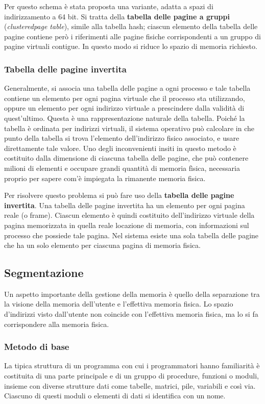 \documentclass[11pt,a4paper]{article}
\begin{document}
Per questo schema è stata proposta una variante, adatta a spazi di indirizzamento a 64
bit. Si tratta della \textbf{tabella delle pagine a gruppi} (\emph{clusteredpage table}), simile alla tabella hash;
ciascun elemento della tabella delle pagine contiene però i riferimenti alle pagine fisiche cor­rispondenti a un gruppo di pagine virtuali contigue. In questo modo si ri­duce lo spazio di memoria richiesto.

\subsubsection{Tabella delle pagine invertita}
Generalmente, si associa una tabella delle pagine a ogni processo e tale tabella contiene un
elemento per ogni pagina virtuale che il processo sta utilizzando, oppure un elemento per
ogni indirizzo virtuale a prescindere dalla validità di quest'ultimo. Questa è una rappresen­tazione naturale della tabella. Poiché la tabella è ordinata per indirizzi virtuali, il sistema operativo può
calcolare in che punto della tabella si trova l'elemento dell'indirizzo fisico associato, e usare
direttamente tale valore. Uno degli inconvenienti insiti in questo metodo è costituito dalla
dimensione di ciascuna tabella delle pagine, che può contenere milioni di elementi e occu­pare grandi quantità di memoria fìsica, necessaria proprio per sapere com'è impiegata la ri­manente memoria fisica.

Per risolvere questo problema si può fare uso della \textbf{tabella delle pagine invertita}. Una tabel­la delle pagine invertita ha un elemento per ogni pagina reale (o frame). Ciascun elemento è
quindi costituito dell'indirizzo virtuale della pagina memorizzata in quella reale locazione di
memoria, con informazioni sul processo che possiede tale pagina. Nel sistema esiste
una sola tabella delle pagine che ha un solo elemento per ciascuna pagina di memoria fisica.

\subsection{Segmentazione}
Un aspetto importante della gestione della memoria è quello della separazione tra la visione della memoria dell'utente e l'effettiva memo­ria fisica. Lo spazio d'indirizzi visto dall'utente non coincide con l'effettiva memoria fisica,
ma lo si fa corrispondere alla memoria fisica.

\subsubsection{Metodo di base}
La tipica struttura di un programma con cui i programmatori hanno familiarità è costi­tuita di una parte principale e di un gruppo di procedure, funzioni o moduli, insieme con di­verse strutture dati come tabelle, matrici, pile, variabili e così via. Ciascuno di questi moduli
o elementi di dati si identifica con un nome.
\end{document}
